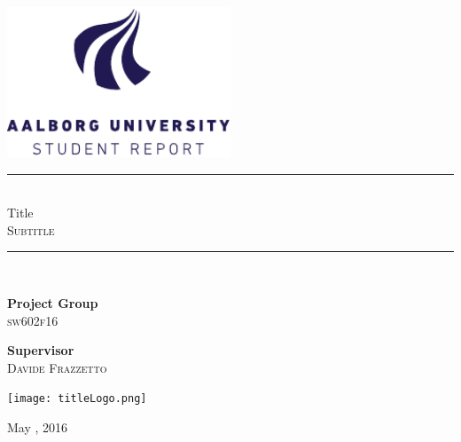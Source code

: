 \begin{titlepage}
\begin{center}
\newcommand{\HRule}{\rule{\linewidth}{0.5mm}}

\includegraphics[width=0.5\textwidth]{figures/aau_logo_en.pdf}~\\[1cm]


\vspace{2em}
\HRule \\[0.1cm]
{
\huge Title\\\large\textsc{Subtitle}\\
}

\HRule \\[1.5cm]

\begin{minipage}{0.4\textwidth}
\begin{flushleft} \large
\textbf{Project Group}\\
\textsc{sw602f16}
\end{flushleft}
\end{minipage}
\begin{minipage}{0.4\textwidth}
\begin{flushright} \large
\textbf{Supervisor} \\
\textsc{Davide Frazzetto}
\end{flushright}
\end{minipage}

\begin{center}
\texttt{[image: titleLogo.png]}
\end{center}


\vfill

{\large May , 2016}

\end{center}
\end{titlepage}
